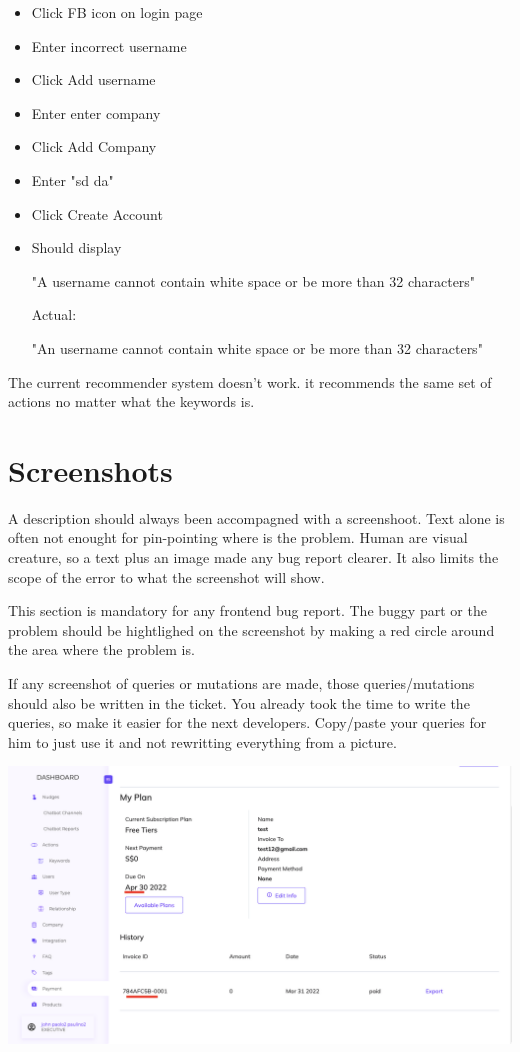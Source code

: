 \documentclass[a4paper,article,oneside]{memoir}
\begin{document}
\noindent{}

\begin{itemize}
  \item Click FB icon on login page
  \item Enter incorrect username
  \item Click Add username
  \item Enter enter company
  \item Click Add Company
  \item Enter "sd da"
  \item Click Create Account
  \item {Should display

"A username cannot contain white space or be more than 32 characters"

Actual:

"An username cannot contain white space or be more than 32 characters"}
\end{itemize}

\noindent{}

The current recommender system doesn't work. it recommends the same set of actions no matter what the keywords is.

        \section{Screenshots}
        A description should always been accompagned with a screenshoot. Text alone is often not enought for pin-pointing where is the problem. Human are visual creature, so a text plus an image made any bug report clearer. It also limits the scope of the error to what the screenshot will show.
        
        This section is mandatory for any frontend bug report. The buggy part or the problem should be hightlighed on the screenshot by making a red circle around the area where the problem is.

If any screenshot of queries or mutations are made, those queries/mutations should also be written in the ticket. You already took the time to write the queries, so make it easier for the next developers. Copy/paste your queries for him to just use it and not rewritting everything from a picture.
        
\noindent{}

\includegraphics[width=\textwidth]{3}
\end{document}
